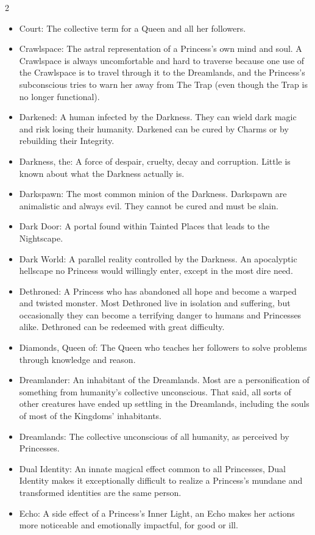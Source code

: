 \begin{multicols}{2}
\begin{itemize}
  \item Court: The collective term for a Queen and all her followers. 
  \item Crawlspace: The astral representation of a Princess's own mind and soul. A Crawlspace is always uncomfortable and hard to traverse because one use of the Crawlspace is to travel through it to the Dreamlands, and the Princess's subconscious tries to warn her away from The Trap (even though the Trap is no longer functional). 
  \item Darkened: A human infected by the Darkness. They can wield dark magic and risk losing their humanity. Darkened can be cured by Charms or by rebuilding their Integrity. 
  \item Darkness, the: A force of despair, cruelty, decay and corruption. Little is known about what the Darkness actually is. 
  \item Darkspawn: The most common minion of the Darkness. Darkspawn are animalistic and always evil. They cannot be cured and must be slain. 
  \item Dark Door: A portal found within Tainted Places that leads to the Nightscape.
  \item Dark World: A parallel reality controlled by the Darkness. An apocalyptic hellscape no Princess would willingly enter, except in the most dire need. 
  \item Dethroned: A Princess who has abandoned all hope and become a warped and twisted monster. Most Dethroned live in isolation and suffering, but occasionally they can become a terrifying danger to humans and Princesses alike. Dethroned can be redeemed with great difficulty. 
  \item Diamonds, Queen of: The Queen who teaches her followers to solve problems through knowledge and reason.
  \item Dreamlander: An inhabitant of the Dreamlands. Most are a personification of something from humanity's collective unconscious. That said, all sorts of other creatures have ended up settling in the Dreamlands, including the souls of most of the Kingdoms' inhabitants. 
  \item Dreamlands: The collective unconscious of all humanity, as perceived by Princesses. 
  \item Dual Identity: An innate magical effect common to all Princesses, Dual Identity makes it exceptionally difficult to realize a Princess's mundane and transformed identities are the same person. 
  \item Echo: A side effect of a Princess's Inner Light, an Echo makes her actions more noticeable and emotionally impactful, for good or ill. 

\end{itemize}
\end{multicols}
